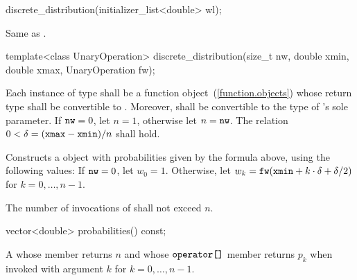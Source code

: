 %
\begin{itemdecl}
discrete_distribution(initializer_list<double> wl);
\end{itemdecl}

\begin{itemdescr}
\pnum\effects
 Same as .
\end{itemdescr}

\begin{itemdecl}
template<class UnaryOperation>
  discrete_distribution(size_t nw, double xmin, double xmax, UnaryOperation fw);
\end{itemdecl}

\begin{itemdescr}
\pnum\requires
 Each instance of type 
 shall be a function object~(\ref{function.objects})
 whose return type shall be convertible to .
 Moreover,
  shall be convertible
 to the type of 's sole parameter.
 If $ \texttt{\protect nw} = 0 $, let $ n = 1 $, otherwise let $n = \texttt{\protect nw}$.
 The relation
   $ 0 < \delta = (\texttt{\protect xmax} - \texttt{\protect xmin}) / n $
 shall hold.

\pnum\effects Constructs a  object
 with probabilities given by the formula above,
 using the following values:
 If $\texttt{\protect nw} = 0$,
 let $ w_0 = 1 $.
 Otherwise,
 let $ w_k = \texttt{\protect fw}(\texttt{\protect xmin} + k \cdot \delta + \delta / 2) $
 for $ k = 0, \ldots, n\!-\!1 $.

\pnum\complexity
 The number of invocations of  shall not exceed $n$.
\end{itemdescr}

%
\begin{itemdecl}
vector<double> probabilities() const;
\end{itemdecl}

\begin{itemdescr}
\pnum\returns A 
 whose  member returns $n$
 and whose $ \texttt{\protect operator[]} $ member returns $p_k$
 when invoked with argument $k$ for $k = 0, \ldots, n\!-\!1 $.
\end{itemdescr}



